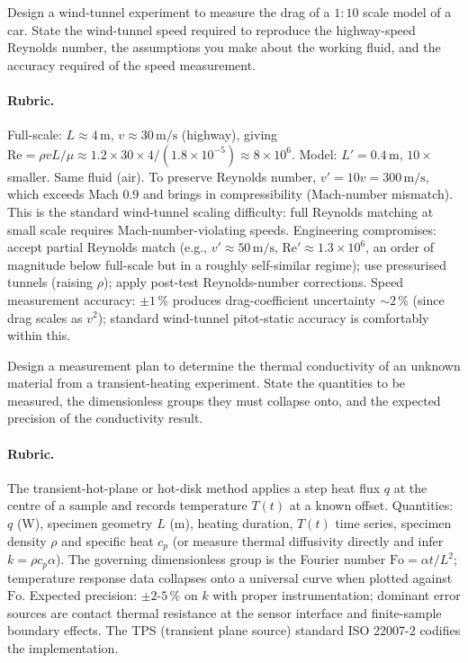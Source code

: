 \begin{exercise}
Design a wind-tunnel experiment to measure the drag of a $1{:}10$
scale model of a car. State the wind-tunnel speed required to
reproduce the highway-speed Reynolds number, the assumptions you
make about the working fluid, and the accuracy required of the speed
measurement.

\paragraph{Rubric.} Full-scale: $L \approx 4 \,\si{\meter}$, $v
\approx 30 \,\si{\meter\per\second}$ (highway), giving
$\mathrm{Re} = \rho v L / \mu \approx 1.2 \times 30 \times 4 /
(1.8 \times 10^{-5}) \approx 8 \times 10^{6}$. Model: $L' = 0.4 \,
\si{\meter}$, $10\times$ smaller. Same fluid (air). To preserve
Reynolds number, $v' = 10 v = 300 \,\si{\meter\per\second}$, which
exceeds Mach 0.9 and brings in compressibility (Mach-number mismatch).
This is the standard wind-tunnel scaling difficulty: full Reynolds
matching at small scale requires Mach-number-violating speeds.
Engineering compromises: accept partial Reynolds match (e.g., $v'
\approx 50 \,\si{\meter\per\second}$, $\mathrm{Re}' \approx 1.3
\times 10^{6}$, an order of magnitude below full-scale but in a
roughly self-similar regime); use pressurised tunnels (raising
$\rho$); apply post-test Reynolds-number corrections. Speed
measurement accuracy: $\pm 1\,\%$ produces drag-coefficient
uncertainty $\sim 2\,\%$ (since drag scales as $v^2$); standard
wind-tunnel pitot-static accuracy is comfortably within this.
\end{exercise}

\begin{exercise}
Design a measurement plan to determine the thermal conductivity of
an unknown material from a transient-heating experiment. State the
quantities to be measured, the dimensionless groups they must
collapse onto, and the expected precision of the conductivity result.

\paragraph{Rubric.} The transient-hot-plane or hot-disk method
applies a step heat flux $q$ at the centre of a sample and records
temperature $T(t)$ at a known offset. Quantities: $q$ (W),
specimen geometry $L$ (m), heating duration, $T(t)$ time series,
specimen density $\rho$ and specific heat $c_p$ (or measure
thermal diffusivity directly and infer $k = \rho c_p \alpha$). The
governing dimensionless group is the Fourier number $\mathrm{Fo}
= \alpha t / L^{2}$; temperature response data collapses onto a
universal curve when plotted against $\mathrm{Fo}$. Expected
precision: $\pm 2$-$5\,\%$ on $k$ with proper instrumentation;
dominant error sources are contact thermal resistance at the
sensor interface and finite-sample boundary effects. The TPS
(transient plane source) standard ISO 22007-2 codifies the
implementation.
\end{exercise}

